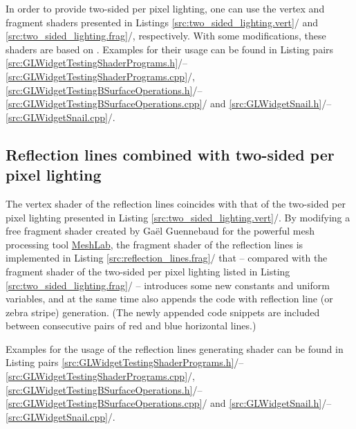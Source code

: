 \documentclass[b5paper, twosided]{book}
\DeclareRobustCommand{\mref}[1]{\ref{#1}{\relsize{-1}/\pageref{#1}}}
\begin{document}
In order to provide two-sided per pixel lighting, one can use the vertex and fragment shaders presented in Listings \mref{src:two_sided_lighting.vert} and \mref{src:two_sided_lighting.frag}, respectively. With some modifications, these shaders are based on \citep{RostLiceaKane2006}. Examples for their usage can be found in Listing pairs \mref{src:GLWidgetTestingShaderPrograms.h}--\mref{src:GLWidgetTestingShaderPrograms.cpp},  \mref{src:GLWidgetTestingBSurfaceOperations.h}--\mref{src:GLWidgetTestingBSurfaceOperations.cpp} and \mref{src:GLWidgetSnail.h}--\mref{src:GLWidgetSnail.cpp}.



\subsection{Reflection lines combined with two-sided per pixel lighting}

The vertex shader of the reflection lines coincides with that of the two-sided per pixel lighting presented in Listing \mref{src:two_sided_lighting.vert}. By modifying a free fragment shader created by Ga\"el Guennebaud for the powerful mesh processing tool \href{http://meshlab.sourceforge.net/}{MeshLab}, the fragment shader of the reflection lines is implemented in Listing \mref{src:reflection_lines.frag} that -- compared with the fragment shader of the two-sided per pixel lighting listed in Listing \mref{src:two_sided_lighting.frag} -- introduces some new constants and uniform variables, and at the same time also appends the code with reflection line (or zebra stripe) generation. (The newly appended code snippets are included between consecutive pairs of red and blue horizontal lines.)


Examples for the usage of the reflection lines generating shader can be found in Listing pairs \mref{src:GLWidgetTestingShaderPrograms.h}--\mref{src:GLWidgetTestingShaderPrograms.cpp},  \mref{src:GLWidgetTestingBSurfaceOperations.h}--\mref{src:GLWidgetTestingBSurfaceOperations.cpp} and \mref{src:GLWidgetSnail.h}--\mref{src:GLWidgetSnail.cpp}.
\end{document}
